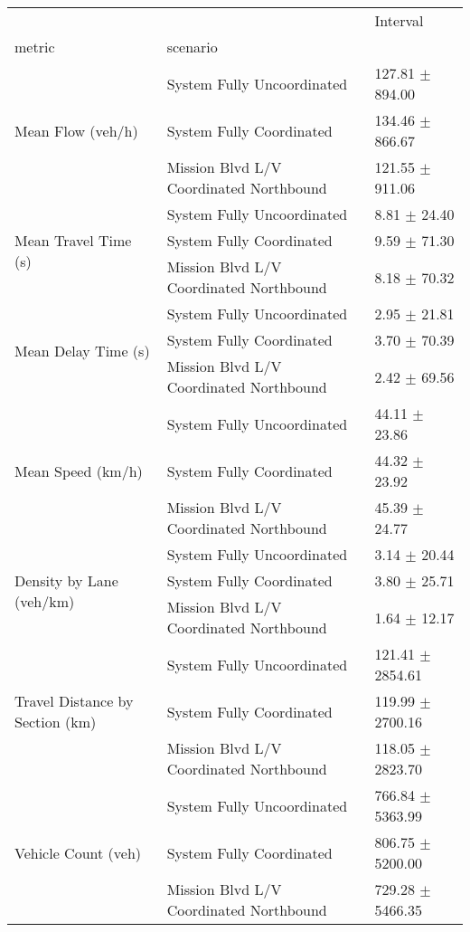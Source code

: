 \begin{tabular}{lll}
\toprule
 &  & Interval \\
metric & scenario &  \\
\midrule
\multirow[t]{3}{*}{Mean Flow (veh/h)} & System Fully Uncoordinated & 127.81 $\pm$ 894.00 \\
 & System Fully Coordinated & 134.46 $\pm$ 866.67 \\
 & Mission Blvd L/V Coordinated Northbound & 121.55 $\pm$ 911.06 \\
\multirow[t]{3}{*}{Mean Travel Time (s)} & System Fully Uncoordinated & 8.81 $\pm$ 24.40 \\
 & System Fully Coordinated & 9.59 $\pm$ 71.30 \\
 & Mission Blvd L/V Coordinated Northbound & 8.18 $\pm$ 70.32 \\
\multirow[t]{3}{*}{Mean Delay Time (s)} & System Fully Uncoordinated & 2.95 $\pm$ 21.81 \\
 & System Fully Coordinated & 3.70 $\pm$ 70.39 \\
 & Mission Blvd L/V Coordinated Northbound & 2.42 $\pm$ 69.56 \\
\multirow[t]{3}{*}{Mean Speed (km/h)} & System Fully Uncoordinated & 44.11 $\pm$ 23.86 \\
 & System Fully Coordinated & 44.32 $\pm$ 23.92 \\
 & Mission Blvd L/V Coordinated Northbound & 45.39 $\pm$ 24.77 \\
\multirow[t]{3}{*}{Density by Lane (veh/km)} & System Fully Uncoordinated & 3.14 $\pm$ 20.44 \\
 & System Fully Coordinated & 3.80 $\pm$ 25.71 \\
 & Mission Blvd L/V Coordinated Northbound & 1.64 $\pm$ 12.17 \\
\multirow[t]{3}{*}{Travel Distance by Section (km)} & System Fully Uncoordinated & 121.41 $\pm$ 2854.61 \\
 & System Fully Coordinated & 119.99 $\pm$ 2700.16 \\
 & Mission Blvd L/V Coordinated Northbound & 118.05 $\pm$ 2823.70 \\
\multirow[t]{3}{*}{Vehicle Count (veh)} & System Fully Uncoordinated & 766.84 $\pm$ 5363.99 \\
 & System Fully Coordinated & 806.75 $\pm$ 5200.00 \\
 & Mission Blvd L/V Coordinated Northbound & 729.28 $\pm$ 5466.35 \\
\bottomrule
\end{tabular}
